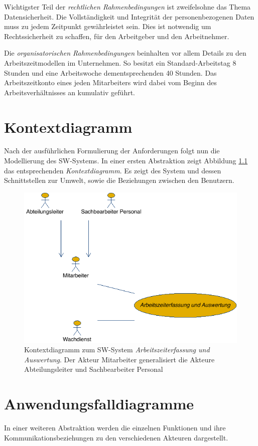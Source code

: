 Wichtigster Teil der \textit{rechtlichen Rahmenbedingungen} ist zweifelsohne das Thema Datensicherheit. Die Vollst\"andigkeit und Integrit\"at der personenbezogenen Daten muss zu jedem Zeitpunkt gew\"ahrleistet sein. Dies ist notwendig um Rechtssicherheit zu schaffen, f\"ur den Arbeitgeber und den Arbeitnehmer.  \newline

Die \textit{organisatorischen Rahmenbedingungen} beinhalten vor allem Details zu den Arbeitszeitmodellen im Unternehmen. So besitzt ein Standard-Arbeitstag 8 Stunden und eine Arbeitswoche dementsprechenden 40 Stunden. Das Arbeitszeitkonto eines jeden Mitarbeiters wird dabei vom Beginn des Arbeitsverh\"altnisses an kumulativ gef\"uhrt.  

\newpage

\chapter{Kontextdiagramm}
Nach der ausf\"uhrlichen Formulierung der Anforderungen folgt nun die Modellierung des SW-Systems. In einer ersten Abstraktion zeigt Abbildung \ref{Kontext} das entsprechenden \textit{Kontextdiagramm}.  Es zeigt des System und dessen Schnittstellen zur Umwelt, sowie die Beziehungen zwischen den Benutzern.

\begin{figure}[hbp]
	\centering
	\includegraphics[width=0.9\linewidth]{UML/Export/Kontext.png}
	\caption{Kontextdiagramm zum SW-System \textit{Arbeitszeiterfassung und Auswertung}. Der Akteur Mitarbeiter generalisiert die Akteure Abteilungsleiter und Sachbearbeiter Personal}
	\label{Kontext}
\end{figure}

\chapter{Anwendungsfalldiagramme}
In einer weiteren Abstraktion werden die einzelnen Funktionen und ihre Kommunikationsbeziehungen zu den verschiedenen Akteuren dargestellt. 

